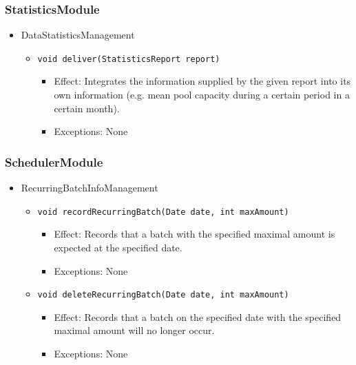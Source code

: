 \documentclass[a4paper,10pt]{article}
\begin{document}
\subsubsection*{StatisticsModule}
\begin{itemize}
	\item DataStatisticsManagement
	\begin{itemize}
		\item \texttt{void deliver(StatisticsReport report)}
		\begin{itemize}
			\item Effect: Integrates the information supplied by the given report into its own information (e.g. mean pool capacity during a certain period in a certain month).
			\item Exceptions: None
		\end{itemize}
	\end{itemize}
\end{itemize}

\subsubsection*{SchedulerModule}
\begin{itemize}
	\item RecurringBatchInfoManagement
	\begin{itemize}
		\item \texttt{void recordRecurringBatch(Date date, int maxAmount)}
		\begin{itemize}
			\item Effect: Records that a batch with the specified maximal amount is expected at the specified date.
			\item Exceptions: None
		\end{itemize}

		\item \texttt{void deleteRecurringBatch(Date date, int maxAmount)}
		\begin{itemize}
			\item Effect: Records that a batch on the specified date with the specified maximal amount will no longer occur.
			\item Exceptions: None
		\end{itemize}
	\end{itemize}
\end{itemize}
\end{document}
